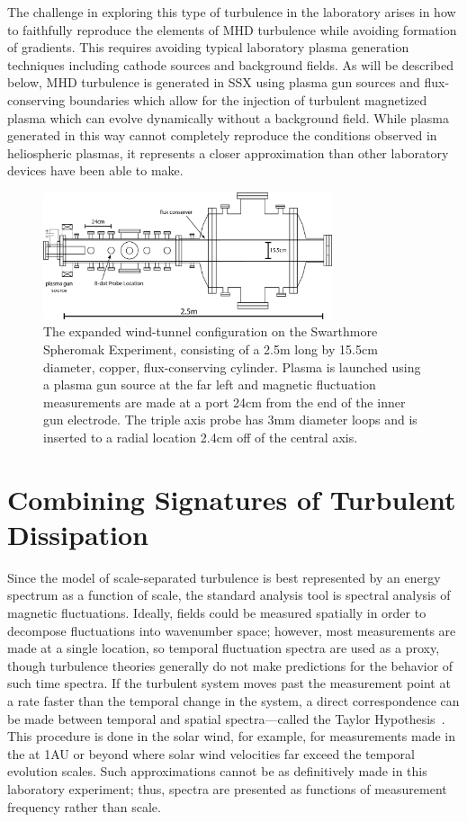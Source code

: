 \documentclass[aip,pop,amsmath,amssymb,preprint,superscriptaddress]{revtex4-1} %
\begin{document}
The challenge in exploring this type of turbulence in the laboratory arises in how to faithfully reproduce the elements of MHD turbulence while avoiding formation of gradients. This requires avoiding typical laboratory plasma generation techniques including cathode sources and background fields. As will be described below, MHD turbulence is generated in SSX using plasma gun sources and flux-conserving boundaries which allow for the injection of turbulent magnetized plasma which can evolve dynamically without a background field. While plasma generated in this way cannot completely reproduce the conditions observed in heliospheric plasmas, it represents a closer approximation than other laboratory devices have been able to make.

\begin{figure}
\centerline{
\includegraphics[width=8.5cm]{figure1.jpg}}
\caption{\label{fig:diagram} The expanded wind-tunnel configuration on the Swarthmore Spheromak Experiment, consisting of a 2.5m long by 15.5cm diameter, copper, flux-conserving cylinder. Plasma is launched using a plasma gun source at the far left and magnetic fluctuation measurements are made at a port 24cm from the end of the inner gun electrode. The triple axis probe has 3mm diameter loops and is inserted to a radial location 2.4cm off of the central axis.}
\end{figure}

\section{Combining Signatures of Turbulent Dissipation}

Since the model of scale-separated turbulence is best represented by an energy spectrum as a function of scale, the standard analysis tool is spectral analysis of magnetic fluctuations. Ideally, fields could be measured spatially in order to decompose fluctuations into wavenumber space; however, most measurements are made at a single location, so temporal fluctuation spectra are used as a proxy, though turbulence theories generally do not make predictions for the behavior of such time spectra. If the turbulent system moves past the measurement point at a rate faster than the temporal change in the system, a direct correspondence can be made between temporal and spatial spectra---called the Taylor Hypothesis~\cite{deWit2013}. This procedure is done in the solar wind, for example, for measurements made in the at 1AU or beyond where solar wind velocities far exceed the temporal evolution scales. Such approximations cannot be as definitively made in this laboratory experiment; thus, spectra are presented as functions of measurement frequency rather than scale.
\end{document}
